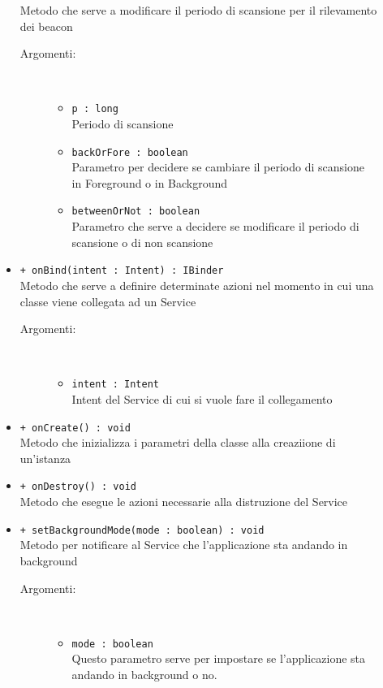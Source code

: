 \documentclass[../DefinizioneDiProdotto.tex]{subfiles}
\begin{document}
\begin{description}
\begin{itemize}
Metodo che serve a modificare il periodo di scansione per il rilevamento dei beacon
 \begin{description}
\item[Argomenti:] \
\begin{itemize}
\item \texttt{p : long}\\
Periodo di scansione\item \texttt{backOrFore : boolean}\\
Parametro per decidere se cambiare il periodo di scansione in Foreground o in Background\item \texttt{betweenOrNot : boolean}\\
Parametro che serve a decidere se modificare il periodo di scansione o di non scansione\end{itemize}
\end{description}
\item \texttt{+ onBind(intent : Intent) : IBinder}\\
Metodo che serve a definire determinate azioni nel momento in cui una classe viene collegata ad un Service 
 \begin{description}
\item[Argomenti:] \
\begin{itemize}
\item \texttt{intent : Intent}\\
Intent del Service di cui  si vuole fare il collegamento  \end{itemize}
\end{description}
\item \texttt{+ onCreate() : void}\\
Metodo che inizializza i parametri della classe alla creaziione di un'istanza
 \item \texttt{+ onDestroy() : void}\\
Metodo che esegue le azioni necessarie alla distruzione del Service
 \item \texttt{+ setBackgroundMode(mode : boolean) : void}\\
Metodo per notificare al Service che l'applicazione sta andando in background 
 \begin{description}
\item[Argomenti:] \
\begin{itemize}
\item \texttt{mode : boolean}\\
Questo parametro serve per impostare se l'applicazione sta andando in background o no.\end{itemize}

\end{description}
\end{itemize}
\end{description}
\end{document}
